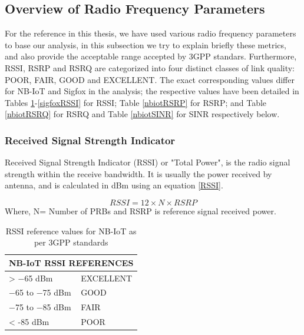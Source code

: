 \documentclass[12pt]{article}
\begin{document}
\subsection{Overview of Radio Frequency Parameters}\label{overview of RF}

For the reference in this thesis, we have used various radio frequency parameters to base our analysis, in this subsection we try to explain briefly these metrics, and also provide the acceptable range accepted by 3GPP standars. Furthermore, RSSI, RSRP and RSRQ are categorized into four distinct classes of link quality: POOR, FAIR, GOOD and EXCELLENT. The exact corresponding values differ for NB-IoT and Sigfox in the analysis; the respective values have been detailed in Tables \ref{nbiotRSSI}-\ref{sigfoxRSSI} for RSSI;  Table \ref{nbiotRSRP} for RSRP; and Table \ref{nbiotRSRQ} for RSRQ and Table \ref{nbiotSINR} for SINR respectively below.


\subsubsection{Received Signal Strength Indicator}
Received Signal Strength Indicator (RSSI) or "Total  Power", is the radio  signal  strength  within  the  receive bandwidth. It is usually the power received by antenna, and is  calculated in dBm using an equation \ref{RSSI}.

\begin{equation}
      RSSI = {12 \times N \times RSRP}
      \label{RSSI}
\end{equation}
Where, N= Number of PRBs and RSRP is reference signal received power.

\begin{table}[h]

\centering
\caption {RSSI reference values for NB-IoT as per 3GPP standards \cite{3GPP,sikora2019performance}}

\begin{tabular}{|p{5cm}|p{5cm}|}
\hline
\multicolumn{2}{|c|}{NB-IoT RSSI REFERENCES} \\ \hline
 > −65 dBm                           & EXCELLENT                     \\ \hline
−65 to −75 dBm                      & GOOD                          \\ \hline
−75 to −85 dBm                      & FAIR                          \\ \hline
< -85 dBm                           & POOR                          \\ \hline
\end{tabular}
\label{nbiotRSSI}

\end{table}
\end{document}
